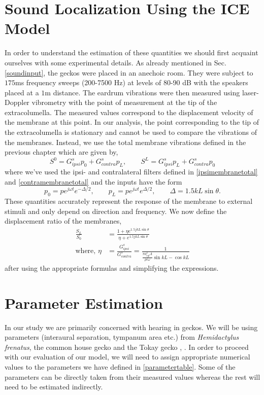 \section{Sound Localization Using the ICE Model}\label{localizationsection}
In order to understand the estimation of 
these quantities we should first acquaint ourselves with some experimental details. As already mentioned in Sec. \ref{soundinput}, the geckos were placed in
an anechoic room. They were subject to $175$ms frequency sweeps (200-7500 Hz) at levels of 80-90 dB with the speakers placed at
a $1$m distance. The eardrum vibrations were then measured using laser-Doppler vibrometry with the point
of measurement at the tip of the extracolumella. The measured values correspond to the displacement velocity of the membrane at this point.  
In our analysis, the point corresponding to the tip of the extracolumella is stationary and cannot be used to compare the vibrations of the membranes. 
Instead, we use the total membrane vibrations defined in the previous chapter which are given by,
\begin{equation}
 S^0=G^s_{ipsi}p_0+G^s_{contra}p_L,\qquad S^L=G^s_{ipsi}p_L+G^s_{contra}p_0
\end{equation}
where we've used the ipsi- and contralateral filters defined in \eqref{ipsimembranetotal} and \eqref{contramembranetotal} and the
inputs have the form
\begin{equation}\label{newsoundinput}
 p_0=pe^{j\omega t} e^{-\Delta/2},\qquad p_L=pe^{j\omega t} e^{\Delta/2},\qquad \Delta=1.5kL\sin\theta.
\end{equation}
These quantities accurately
represent the response of the membrane to external stimuli and only depend on direction and frequency. We now define the displacement ratio of
the membranes,
\begin{align}
 \frac{S_L}{S_0}&=\frac{1+\eta e^{1.5jkL\sin\theta}}{\eta+e^{1.5jkL\sin\theta}}\\
 \mbox{where, }\eta&=\frac{G^s_{ipsi}}{G^s_{contra}}=\frac{1}{\frac{\pi a^2_{cyl}\Lambda}{\rho c\omega}\sin kL-\cos kL}
\end{align}
after using the appropriate formulas and simplifying the expressions.
\section{Parameter Estimation}\label{parameterestimation}
In our study we are primarily concerned with hearing in geckos. We will be using
parameters (interaural separation, tympanum area etc.) from \textit{Hemidactylus frenatus}, the common house gecko
\cite{dalsgaardmanley2} and the Tokay gecko \cite{dalsgaardmanley1}, \cite{dalsgaardtangcarr}. In order to proceed
with our evaluation of our model, we will need to assign appropriate numerical values to the parameters we have
defined in \ref{parametertable}. Some of the parameters can be directly taken from their measured values whereas
the rest will need to be estimated indirectly. 


